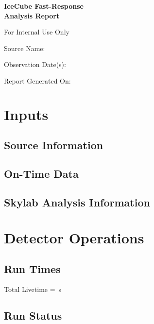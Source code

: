 \documentclass[titlepage]{article}
\begin{document}
\begin{titlepage}
  \centering
  \vspace{4cm}
  {\huge\bfseries IceCube Fast-Response \\ Analysis Report\par}
  \vspace{1cm}
  {\LARGE For Internal Use Only\par}
  \vfill
  {\Large Source Name: \\ \itshape\sourcename\par}
  \vspace{0.5cm}
  {\Large Observation Date(s):\\ \obsdate \par}
  \vfill
  \vspace{1cm} 
  {\Large Report Generated On:\\ \reportdate \par}
\end{titlepage}

\section{Inputs}
\subsection{Source Information}
\sourcetable
\subsection{On-Time Data}
\ontimetable
\subsection{Skylab Analysis Information}
\skylabtable 

\pagebreak
\section{Detector Operations}

\subsection{Run Times}
\runtimetable

Total Livetime = \livetime\,s

\subsection{Run Status}
\runstatustable
\end{document}

